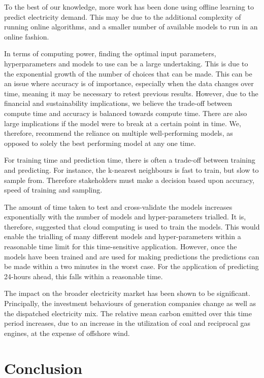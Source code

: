 \documentclass[final,3p,times,twocolumn,numbers]{elsarticle}
\begin{document}
To the best of our knowledge, more work has been done using offline learning to predict electricity demand. This may be due to the additional complexity of running online algorithms, and a smaller number of available models to run in an online fashion.

In terms of computing power, finding the optimal input parameters, hyperparameters and models to use can be a large undertaking. This is due to the exponential growth of the number of choices that can be made. This can be an issue where accuracy is of importance, especially when the data changes over time, meaning it may be necessary to retest previous results. However, due to the financial and sustainability implications, we believe the trade-off between compute time and accuracy is balanced towards compute time. There are also large implications if the model were to break at a certain point in time. We, therefore, recommend the reliance on multiple well-performing models, as opposed to solely the best performing model at any one time. 

For training time and prediction time, there is often a trade-off between training and predicting. For instance, the k-nearest neighbours is fast to train, but slow to sample from. Therefore stakeholders must make a decision based upon accuracy, speed of training and sampling. 

The amount of time taken to test and cross-validate the models increases exponentially with the number of models and hyper-parameters trialled. It is, therefore, suggested that cloud computing is used to train the models. This would enable the trialling of many different models and hyper-parameters within a reasonable time limit for this time-sensitive application. However, once the models have been trained and are used for making predictions the predictions can be made within a two minutes in the worst case. For the application of predicting 24-hours ahead, this falls within a reasonable time.

The impact on the broader electricity market has been shown to be significant. Principally, the investment behaviours of generation companies change as well as the dispatched electricity mix. The relative mean carbon emitted over this time period increases, due to an increase in the utilization of coal and reciprocal gas engines, at the expense of offshore wind.




\section{Conclusion}
\label{sec:conclusion}
\end{document}

